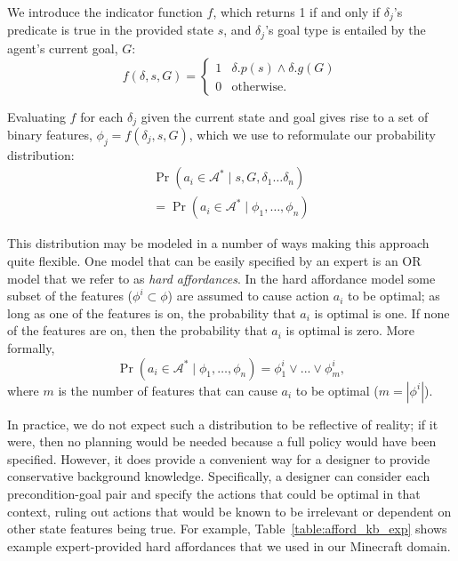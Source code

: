 \documentclass[letterpaper]{article}
\begin{document}
We introduce the indicator function $f$, which returns 1 if and only if $\delta_j$'s predicate is true in the provided state $s$, and $\delta_j$'s goal type is entailed by the agent's current goal, $G$:
\begin{equation}
f(\delta, s, G) = 
\begin{cases}
1& \delta.p(s) \wedge \delta.g(G) \\
0& \text{otherwise.}
\end{cases}
\label{eq:f_func_def}
\end{equation}

Evaluating $f$ for each $\delta_j$ given the current state and goal gives rise to a set of binary features,
$\phi_j = f(\delta_j, s, G)$, which we use to reformulate our probability distribution:
\begin{multline}
\Pr(a_i \in \mathcal{A}^*  \mid s, G, \delta_1 \ldots \delta_n) \\
= \Pr(a_i \in \mathcal{A}^*  \mid \phi_1, \ldots, \phi_n)
\label{eq:feature_rep}
\end{multline}


This distribution may be modeled in a number of ways making this
approach quite flexible. One model that can be easily specified by
an expert is an OR model that we refer to as {\em hard affordances}.
In the hard affordance model some subset of the features 
($\phi^i \subset \phi$) are
assumed to cause action $a_i$ to be optimal; as long as one of
the features is on, the probability that $a_i$ is optimal is one.
If none of the features are on, then the probability that $a_i$ is 
optimal is zero. More formally,
\begin{equation}
\Pr(a_i \in \mathcal{A}^*  \mid \phi_1, \ldots, \phi_n) = \phi_1^i \lor ... \lor \phi_m^i,
\end{equation}
where $m$ is the number of features that can cause $a_i$ to be optimal ($m = |\phi^i|$).

In practice, we do not expect such a distribution to be reflective of
reality; if it were, then no planning would be needed because a full
policy would have been specified. However, it does provide a
convenient way for a designer to provide conservative background
knowledge. Specifically, a designer can consider each precondition-goal
pair and specify the actions that could be optimal in that context, ruling
out actions that would be known to be irrelevant or dependent on other
state features being true. For example,
Table~\ref{table:afford_kb_exp} shows example expert-provided
hard affordances that we used in our Minecraft domain.
\end{document}
